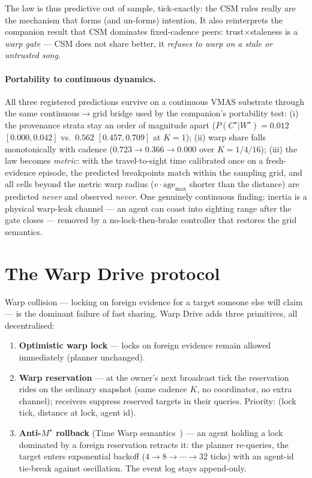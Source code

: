 \documentclass{article}
\newcommand{\wstar}{W^{\star}}
\newcommand{\mstar}{M^{\star}}
\newcommand{\cstar}{C^{\star}}
\begin{document}
The law is thus predictive out of sample, tick-exactly: the CSM rules
really are the mechanism that forms (and un-forms) intention. It also
reinterprets the companion result that CSM dominates fixed-cadence
peers: trust$\times$staleness is a \emph{warp gate} --- CSM does not
share better, it \emph{refuses to warp on a stale or untrusted song}.

\paragraph{Portability to continuous dynamics.} All three registered
predictions survive on a continuous VMAS substrate through the same
continuous$\to$grid bridge used by the companion's portability test:
(i) the provenance strata stay an order of magnitude apart
($P(\cstar|\wstar)=0.012$ $[0.000,0.042]$ vs.\ $0.562$
$[0.457,0.709]$ at $K{=}1$); (ii) warp share falls monotonically with
cadence ($0.723\to0.366\to0.000$ over $K{=}1/4/16$); (iii) the law
becomes \emph{metric}: with the travel-to-sight time calibrated once
on a fresh-evidence episode, the predicted breakpoints match within
the sampling grid, and all cells beyond the metric warp radius
($v\cdot\mathrm{age}_{\max}$ shorter than the distance) are predicted
\emph{never} and observed \emph{never}. One genuinely continuous
finding: inertia is a physical warp-leak channel --- an agent can
coast into sighting range after the gate closes --- removed by a
no-lock-then-brake controller that restores the grid semantics.

\section{The Warp Drive protocol}
\label{sec:drive}

Warp collision --- locking on foreign evidence for a target someone
else will claim --- is the dominant failure of fast sharing. Warp
Drive adds three primitives, all decentralised:

\begin{enumerate}[leftmargin=20pt,itemsep=2pt,topsep=2pt]
\item \textbf{Optimistic warp lock} --- locks on foreign evidence
  remain allowed immediately (planner unchanged).
\item \textbf{Warp reservation} --- at the owner's next broadcast tick
  the reservation rides on the ordinary snapshot (same cadence $K$, no
  coordinator, no extra channel); receivers suppress reserved targets
  in their queries. Priority: (lock tick, distance at lock, agent id).
\item \textbf{Anti-$\mstar$ rollback} (Time Warp
  semantics~\cite{jefferson1985}) --- an agent holding a lock
  dominated by a foreign reservation retracts it: the planner
  re-queries, the target enters exponential backoff
  ($4\to8\to\cdots\to32$ ticks) with an agent-id tie-break against
  oscillation. The event log stays append-only.
\end{enumerate}
\end{document}
